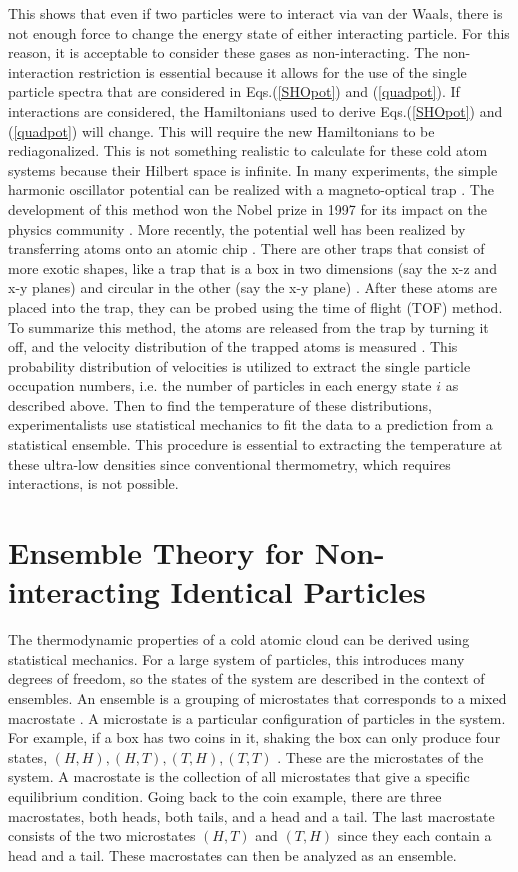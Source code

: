 This shows that even if two particles were to interact via van der Waals, there is not enough force to change the energy state of either interacting particle. For this reason, it is acceptable to consider these gases as non-interacting. 
The non-interaction restriction is essential because it allows for the use of the single particle spectra that are considered in Eqs.\@ (\ref{SHOpot}) and (\ref{quadpot}). 
If interactions are considered, the Hamiltonians used to derive Eqs.\@ (\ref{SHOpot}) and (\ref{quadpot}) will change. 
This will require the new Hamiltonians to be rediagonalized. 
This is not something realistic to calculate for these cold atom systems because their Hilbert space is infinite. 
In many experiments, the simple harmonic oscillator potential can be realized with a magneto-optical trap \cite{Bhar, Viering, Radwell,Phillips_1998}. 
The development of this method won the Nobel prize in 1997 for its impact on the physics community \cite{nobelprize.org_1997}. 
More recently, the potential well has been realized by transferring atoms onto an atomic chip \cite{Es2010}. 
There are other traps that consist of more exotic shapes, like a trap that is a box in two dimensions (say the x-z and x-y planes) and circular in the other (say the x-y plane) \cite{Mukherjee2017}. 
After these atoms are placed into the trap, they can be probed using the time of flight (TOF) method. To summarize this method, the atoms are released from the trap by turning it off, and the velocity distribution of the trapped atoms is measured \cite{Brzozowski,Wheeler_2003}. This probability distribution of velocities is utilized to extract the single particle occupation numbers, i.e. the number of particles in each energy state $i$ as described above. Then to find the temperature of these distributions, experimentalists use statistical mechanics to fit the data to a prediction from a statistical ensemble. This procedure is essential to extracting the temperature at these ultra-low densities since conventional thermometry, which requires interactions, is not possible. 


\section{Ensemble Theory for Non-interacting Identical Particles}
The thermodynamic properties of a cold atomic cloud can be derived using statistical mechanics. For a large system of particles, this introduces many degrees of freedom, so the states of the system are described in the context of ensembles. 
An ensemble is a grouping of microstates that corresponds to a mixed macrostate \cite{Kardar}. A microstate is a particular configuration of particles in the system. For example, if a box has two coins in it, shaking the box can only produce four states, $(H,H),(H,T),(T,H),(T,T)$ \cite{Blundell}. These are the microstates of the system.
A macrostate is the collection of all microstates that give a specific equilibrium condition. Going back to the coin example, there are three macrostates, both heads, both tails, and a head and a tail. The last macrostate consists of the two microstates $(H,T)$ and $(T,H)$ since they each contain a head and a tail. These macrostates can then be analyzed as an ensemble. 


